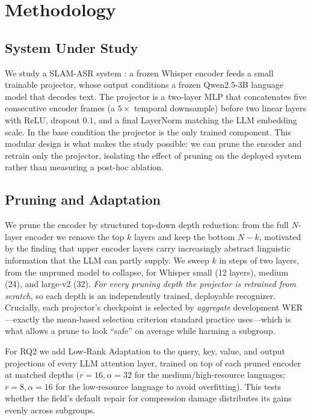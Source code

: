 
\section{Methodology}
\label{sec:method}

\subsection{System Under Study}
We study a SLAM-ASR system \citep{ma2024embarrassingly}: a frozen Whisper
encoder \citep{radford2023robust} feeds a small trainable projector, whose
output conditions a frozen Qwen2.5-3B language model \citep{qwen2025qwen25technicalreport}
that decodes text. The projector is a two-layer MLP that concatenates five
consecutive encoder frames (a $5{\times}$ temporal downsample) before two linear
layers with ReLU, dropout $0.1$, and a final LayerNorm matching the LLM
embedding scale. In the base condition the projector is the only trained
component. This modular design is what makes the study possible: we can prune
the encoder and retrain only the projector, isolating the effect of pruning on
the deployed system rather than measuring a post-hoc ablation.

\subsection{Pruning and Adaptation}
We prune the encoder by structured top-down depth reduction: from the full
$N$-layer encoder we remove the top $k$ layers and keep the bottom $N{-}k$,
motivated by the finding that upper encoder layers carry increasingly abstract
linguistic information \citep{pasad2021layer} that the LLM can partly supply.
We sweep $k$ in steps of two layers, from the unpruned model to collapse, for
Whisper small (12 layers), medium (24), and large-v2 (32). \emph{For every
pruning depth the projector is retrained from scratch}, so each depth is an
independently trained, deployable recognizer. Crucially, each projector's
checkpoint is selected by \emph{aggregate} development WER---exactly the
mean-based selection criterion standard practice uses---which is what allows a
prune to look ``safe'' on average while harming a subgroup.

For RQ2 we add Low-Rank Adaptation \citep{hu2022lora} to the query, key, value,
and output projections of every LLM attention layer, trained on top of each
pruned encoder at matched depths ($r{=}16, \alpha{=}32$ for the
medium/high-resource languages; $r{=}8, \alpha{=}16$ for the low-resource
language to avoid overfitting). This tests whether the field's default repair
for compression damage distributes its gains evenly across subgroups.

